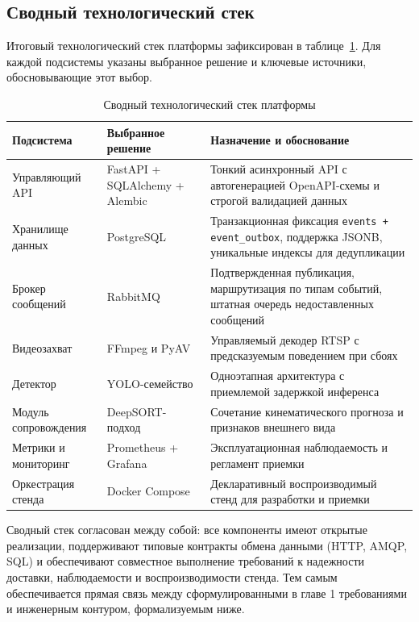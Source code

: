 \subsection{Сводный технологический стек}

Итоговый технологический стек платформы зафиксирован в таблице~\ref{tab:stack_summary}. Для каждой подсистемы указаны выбранное решение и ключевые источники, обосновывающие этот выбор.

\begin{table}[H]
\caption{Сводный технологический стек платформы}
\label{tab:stack_summary}
\begin{tabularx}{\textwidth}{>{\raggedright\arraybackslash}p{} >{\raggedright\arraybackslash}p{} X}
\toprule
Подсистема & Выбранное решение & Назначение и обоснование \\
\midrule
Управляющий API & FastAPI + SQLAlchemy + Alembic~\cite{fastapi_docs,sqlalchemy_docs,alembic_docs} & Тонкий асинхронный API с автогенерацией OpenAPI-схемы и строгой валидацией данных \\
Хранилище данных & PostgreSQL~\cite{postgresql_docs} & Транзакционная фиксация \texttt{events + event\_outbox}, поддержка JSONB, уникальные индексы для дедупликации \\
Брокер сообщений & RabbitMQ~\cite{rabbitmq_docs,rabbitmq_confirms,rabbitmq_dlq} & Подтвержденная публикация, маршрутизация по типам событий, штатная очередь недоставленных сообщений \\
Видеозахват & FFmpeg и PyAV~\cite{ffmpeg_docs,pyav_docs} & Управляемый декодер RTSP с предсказуемым поведением при сбоях \\
Детектор & YOLO-семейство~\cite{redmon2016yolo,redmon2018yolov3,ultralytics_docs} & Одноэтапная архитектура с приемлемой задержкой инференса \\
Модуль сопровождения & DeepSORT-подход~\cite{wojke2017deepsort,kalman1960,kuhn1955hungarian} & Сочетание кинематического прогноза и признаков внешнего вида \\
Метрики и мониторинг & Prometheus + Grafana~\cite{prometheus_docs,grafana_docs} & Эксплуатационная наблюдаемость и регламент приемки \\
Оркестрация стенда & Docker Compose~\cite{docker_docs} & Декларативный воспроизводимый стенд для разработки и приемки \\
\bottomrule
\end{tabularx}
\end{table}

Сводный стек согласован между собой: все компоненты имеют открытые реализации, поддерживают типовые контракты обмена данными (HTTP, AMQP, SQL) и обеспечивают совместное выполнение требований к надежности доставки, наблюдаемости и воспроизводимости стенда. Тем самым обеспечивается прямая связь между сформулированными в главе 1 требованиями и инженерным контуром, формализуемым ниже.

